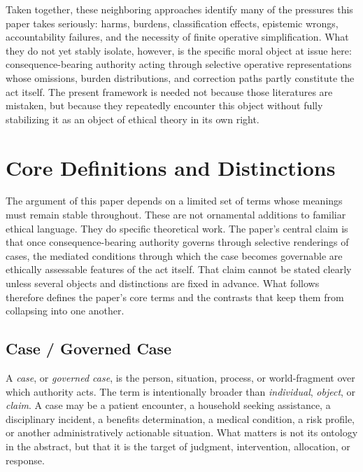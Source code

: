 \documentclass[11pt]{article}
\renewcommand{\emph}[1]{\textit{#1}}
\begin{document}
Taken together, these neighboring approaches identify many of the pressures this paper takes seriously: harms, burdens, classification effects, epistemic wrongs, accountability failures, and the necessity of finite operative simplification. What they do not yet stably isolate, however, is the specific moral object at issue here: consequence-bearing authority acting through selective operative representations whose omissions, burden distributions, and correction paths partly constitute the act itself. The present framework is needed not because those literatures are mistaken, but because they repeatedly encounter this object without fully stabilizing it as an object of ethical theory in its own right. \cite{BowkerStar1999SortingThingsOut,Fricker2007EpistemicInjustice,MoynihanHerdHarvey2015AdministrativeBurden,LepriEtAl2018FairTransparentAccountableADM,Swanson2026MediatedJudgmentConstraint}
\section{Core Definitions and Distinctions}

The argument of this paper depends on a limited set of terms whose meanings must remain stable throughout. These are not ornamental additions to familiar ethical language. They do specific theoretical work. The paper's central claim is that once consequence-bearing authority governs through selective renderings of cases, the mediated conditions through which the case becomes governable are ethically assessable features of the act itself. That claim cannot be stated clearly unless several objects and distinctions are fixed in advance. What follows therefore defines the paper's core terms and the contrasts that keep them from collapsing into one another.

\subsection{Case / Governed Case}

A \emph{case}, or \emph{governed case}, is the person, situation, process, or world-fragment over which authority acts. The term is intentionally broader than \emph{individual}, \emph{object}, or \emph{claim}. A case may be a patient encounter, a household seeking assistance, a disciplinary incident, a benefits determination, a medical condition, a risk profile, or another administratively actionable situation. What matters is not its ontology in the abstract, but that it is the target of judgment, intervention, allocation, or response.
\end{document}
